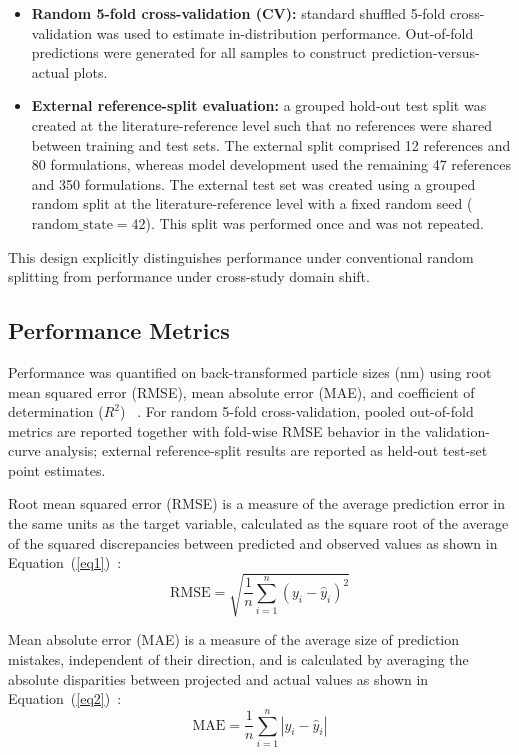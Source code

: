 \documentclass[10pt]{NSP1}
\begin{document}
\begin{itemize}
\item \textbf{Random 5-fold cross-validation (CV):} standard shuffled 5-fold cross-validation was
used to estimate in-distribution performance. Out-of-fold predictions were generated for all
samples to construct prediction-versus-actual plots.
\item \textbf{External reference-split evaluation:} a grouped hold-out test split was created at
the literature-reference level such that no references were shared between training and test sets.
The external split comprised 12 references and 80 formulations, whereas model development used the
remaining 47 references and 350 formulations. The external test set was created using a grouped
random split at the literature-reference level with a fixed random seed ($\mathrm{random\_state} =
42$). This split was performed once and was not repeated.
\end{itemize}

This design explicitly distinguishes performance under conventional random splitting from
performance under cross-study domain shift.

\subsection{Performance Metrics}

Performance was quantified on back-transformed particle sizes (nm) using root mean squared error
(RMSE), mean absolute error (MAE), and coefficient of determination ($R^2$) ~\cite{ref32,ref33,ref34}. For random 5-fold
cross-validation, pooled out-of-fold metrics are reported together with fold-wise RMSE behavior in
the validation-curve analysis; external reference-split results are reported as held-out test-set
point estimates.

Root mean squared error (RMSE) is a measure of the average prediction error in the same units as
the target variable, calculated as the square root of the average of the squared discrepancies
between predicted and observed values as shown in Equation~(\ref{eq1})~\cite{ref27}:
\begin{equation}\label{eq1}
\mathrm{RMSE} = \sqrt{\frac{1}{n}\sum_{i=1}^{n}\left(y_i - \hat{y}_i\right)^2}
\end{equation}

Mean absolute error (MAE) is a measure of the average size of prediction mistakes, independent of
their direction, and is calculated by averaging the absolute disparities between projected and
actual values as shown in Equation~(\ref{eq2})~\cite{ref30}:
\begin{equation}\label{eq2}
\mathrm{MAE} = \frac{1}{n}\sum_{i=1}^{n}\left|y_i - \hat{y}_i\right|
\end{equation}
\end{document}
